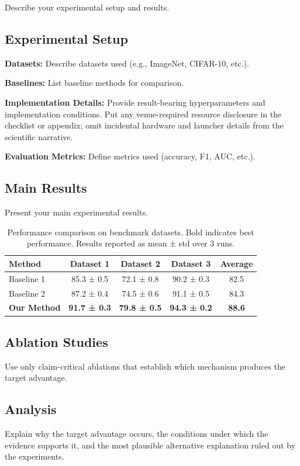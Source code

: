 \documentclass{article}
\begin{document}
Describe your experimental setup and results.

\subsection{Experimental Setup}
\textbf{Datasets:} Describe datasets used (e.g., ImageNet, CIFAR-10, etc.).

\textbf{Baselines:} List baseline methods for comparison.

\textbf{Implementation Details:} Provide result-bearing hyperparameters and implementation conditions. Put any venue-required resource disclosure in the checklist or appendix; omit incidental hardware and launcher details from the scientific narrative.

\textbf{Evaluation Metrics:} Define metrics used (accuracy, F1, AUC, etc.).

\subsection{Main Results}
Present your main experimental results.

\begin{table}[t]
\centering
\caption{Performance comparison on benchmark datasets. Bold indicates best performance. Results reported as mean ± std over 3 runs.}
\label{tab:main_results}
\begin{tabular}{lcccc}
\toprule
Method & Dataset 1 & Dataset 2 & Dataset 3 & Average \\
\midrule
Baseline 1 & 85.3 ± 0.5 & 72.1 ± 0.8 & 90.2 ± 0.3 & 82.5 \\
Baseline 2 & 87.2 ± 0.4 & 74.5 ± 0.6 & 91.1 ± 0.5 & 84.3 \\
\textbf{Our Method} & \textbf{91.7 ± 0.3} & \textbf{79.8 ± 0.5} & \textbf{94.3 ± 0.2} & \textbf{88.6} \\
\bottomrule
\end{tabular}
\end{table}

\subsection{Ablation Studies}
Use only claim-critical ablations that establish which mechanism produces the target advantage.

\subsection{Analysis}
Explain why the target advantage occurs, the conditions under which the evidence supports it, and the most plausible alternative explanation ruled out by the experiments.
\end{document}
